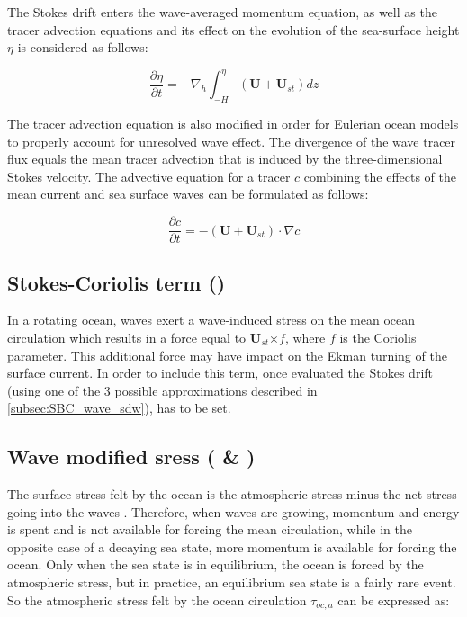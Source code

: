 \documentclass[../main/NEMO_manual]{subfiles}
\begin{document}
The Stokes drift enters the wave-averaged momentum equation, as well as the tracer advection equations
and its effect on the evolution of the sea-surface height ${\eta}$ is considered as follows:

\[
  \frac{\partial{\eta}}{\partial{t}} =
  -\nabla_h \int_{-H}^{\eta} (\mathbf{U} + \mathbf{U}_{st}) dz
\]

The tracer advection equation is also modified in order for Eulerian ocean models to properly account
for unresolved wave effect. The divergence of the wave tracer flux equals the mean tracer advection
that is induced by the three-dimensional Stokes velocity.
The advective equation for a tracer $c$ combining the effects of the mean current and sea surface waves
can be formulated as follows:

\[
  \frac{\partial{c}}{\partial{t}} =
  - (\mathbf{U} + \mathbf{U}_{st}) \cdot \nabla{c}
\]

\subsection[Stokes-Coriolis term (\forcode{ln_stcor})]{Stokes-Coriolis term (\protect{})}
\label{subsec:SBC_wave_stcor}

In a rotating ocean, waves exert a wave-induced stress on the mean ocean circulation which results
in a force equal to $\mathbf{U}_{st}$×$f$, where $f$ is the Coriolis parameter.
This additional force may have impact on the Ekman turning of the surface current.
In order to include this term, once evaluated the Stokes drift (using one of the 3 possible
approximations described in \autoref{subsec:SBC_wave_sdw}),
 has to be set.

\subsection[Wave modified stress (\forcode{ln_tauwoc} \& \forcode{ln_tauw})]{Wave modified sress (\protect{} \& )}
\label{subsec:SBC_wave_tauw}

The surface stress felt by the ocean is the atmospheric stress minus the net stress going
into the waves \citep{janssen.breivik.ea_rpt13}. Therefore, when waves are growing, momentum and energy is spent and is not
available for forcing the mean circulation, while in the opposite case of a decaying sea
state, more momentum is available for forcing the ocean.
Only when the sea state is in equilibrium, the ocean is forced by the atmospheric stress,
but in practice, an equilibrium sea state is a fairly rare event.
So the atmospheric stress felt by the ocean circulation $\tau_{oc,a}$ can be expressed as:
\end{document}
